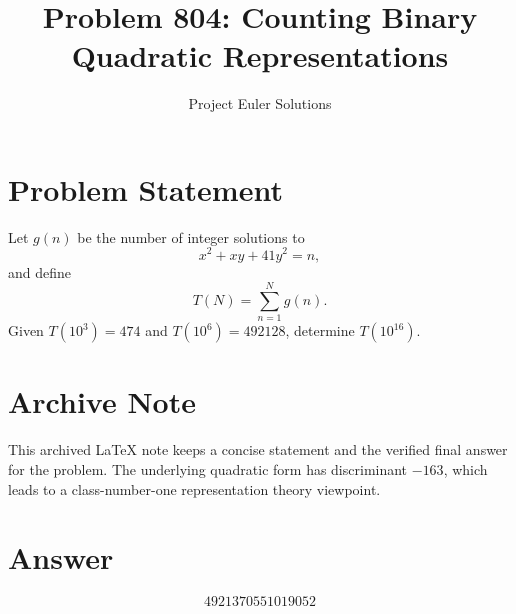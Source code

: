 \documentclass[11pt]{article}
\title{Problem 804: Counting Binary Quadratic Representations}
\author{Project Euler Solutions}
\date{}
\begin{document}
\maketitle

\section{Problem Statement}
Let $g(n)$ be the number of integer solutions to
\[
x^2 + xy + 41y^2 = n,
\]
and define
\[
T(N)=\sum_{n=1}^{N} g(n).
\]
Given $T(10^3)=474$ and $T(10^6)=492128$, determine $T(10^{16})$.

\section{Archive Note}
This archived LaTeX note keeps a concise statement and the verified final answer for the problem. The underlying quadratic form has discriminant $-163$, which leads to a class-number-one representation theory viewpoint.

\section{Answer}

\[
\boxed{4921370551019052}
\]
\end{document}
